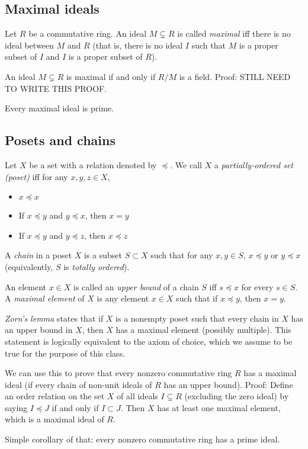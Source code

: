 \documentclass[12pt]{article}
\begin{document}
\subsection{Maximal ideals}
Let $R$ be a commutative ring. An ideal $M \subsetneq R$ is called \textit{maximal} iff there is no ideal between $M$ and $R$ (that is, there is no ideal $I$ such that $M$ is a proper subset of $I$ and $I$ is a proper subset of $R$).
\par
An ideal $M \subsetneq R$ is maximal if and only if $R/M$ is a field. Proof: STILL NEED TO WRITE THIS PROOF.
\par
Every maximal ideal is prime.

\subsection{Posets and chains}
Let $X$ be a set with a relation denoted by $\preceq$. We call $X$ a \textit{partially-ordered set (poset)} iff for any $x, y, z \in X$,
\begin{itemize}
    \item $x \preceq x$
    \item If $x \preceq y$ and $y \preceq x$, then $x=y$
    \item If $x \preceq y$ and $y \preceq z$, then $x \preceq z$
\end{itemize}
A \textit{chain} in a poset $X$ is a subset $S \subset X$ such that for any $x, y \in S$, $x \preceq y$ or $y \preceq x$ (equivalently, $S$ is \textit{totally ordered}).
\par
An element $x \in X$ is called an \textit{upper bound} of a chain $S$ iff $s \preceq x$ for every $s \in S$. A \textit{maximal element} of $X$ is any element $x \in X$ such that if $x \preceq y$, then $x=y$.
\par
\textit{Zorn's lemma} states that if $X$ is a nonempty poset such that every chain in $X$ has an upper bound in $X$, then $X$ has a maximal element (possibly multiple). This statement is logically equivalent to the axiom of choice, which we assume to be true for the purpose of this class.
\par
We can use this to prove that every nonzero commutative ring $R$ has a maximal ideal (if every chain of non-unit ideals of $R$ has an upper bound). Proof: Define an order relation on the set $X$ of all ideals $I \subsetneq R$ (excluding the zero ideal) by saying $I \preceq J$ if and only if $I \subset J$. Then $X$ has at least one maximal element, which is a maximal ideal of $R$.
\par
Simple corollary of that: every nonzero commutative ring has a prime ideal.
\end{document}
